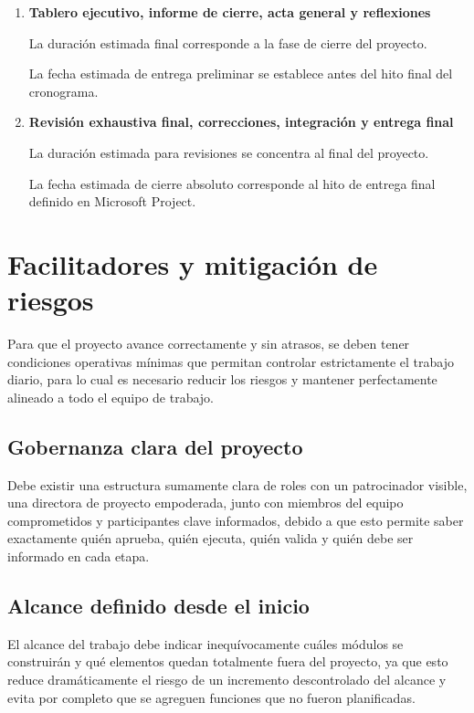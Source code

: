 \documentclass[11pt,spanish]{article}
\begin{document}
\begin{enumerate}
    \item \textbf{Tablero ejecutivo, informe de cierre, acta general y reflexiones}

    La duración estimada final corresponde a la fase de cierre del proyecto.

    La fecha estimada de entrega preliminar se establece antes del hito final del cronograma.

    \item \textbf{Revisión exhaustiva final, correcciones, integración y entrega final}

    La duración estimada para revisiones se concentra al final del proyecto.

    La fecha estimada de cierre absoluto corresponde al hito de entrega final definido en Microsoft Project.
\end{enumerate}

\section{Facilitadores y mitigación de riesgos}

Para que el proyecto avance correctamente y sin atrasos, se deben tener condiciones operativas mínimas que permitan controlar estrictamente el trabajo diario, para lo cual es necesario reducir los riesgos y mantener perfectamente alineado a todo el equipo de trabajo.

\subsection{Gobernanza clara del proyecto}

Debe existir una estructura sumamente clara de roles con un patrocinador visible, una directora de proyecto empoderada, junto con miembros del equipo comprometidos y participantes clave informados, debido a que esto permite saber exactamente quién aprueba, quién ejecuta, quién valida y quién debe ser informado en cada etapa.

\subsection{Alcance definido desde el inicio}

El alcance del trabajo debe indicar inequívocamente cuáles módulos se construirán y qué elementos quedan totalmente fuera del proyecto, ya que esto reduce dramáticamente el riesgo de un incremento descontrolado del alcance y evita por completo que se agreguen funciones que no fueron planificadas.
\end{document}
